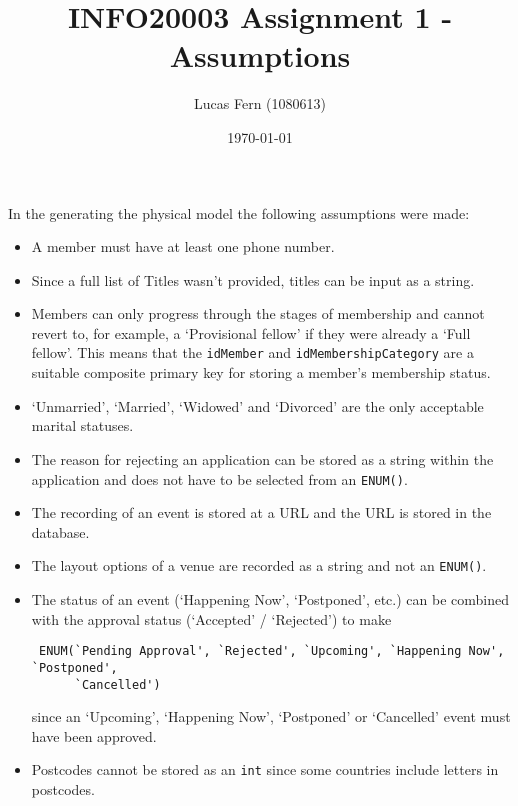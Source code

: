\documentclass{article}
\title{\vspace{-2cm}INFO20003 Assignment 1 - Assumptions}
\date{\today}
\author{Lucas Fern (1080613)}
\begin{document}
\maketitle
In the generating the physical model the following assumptions were made:
\begin{itemize}
    \item A member must have at least one phone number.
    \item Since a full list of Titles wasn't provided, titles can be input as a string.
    \item Members can only progress through the stages of membership and cannot revert to, for example, a `Provisional fellow' if they were already a `Full fellow'. This means that the \verb|idMember| and \verb|idMembershipCategory| are a suitable composite primary key for storing a member's membership status.
    \item `Unmarried', `Married', `Widowed' and `Divorced' are the only acceptable marital statuses.
    \item The reason for rejecting an application can be stored as a string within the application and does not have to be selected from an \verb|ENUM()|.
    \item The recording of an event is stored at a URL and the URL is stored in the database.
    \item The layout options of a venue are recorded as a string and not an \verb|ENUM()|.
    \item The status of an event (`Happening Now', `Postponed', etc.) can be combined with the approval status (`Accepted' / `Rejected') to make \begin{verbatim} ENUM(`Pending Approval', `Rejected', `Upcoming', `Happening Now', `Postponed', 
      `Cancelled') \end{verbatim}
    since an `Upcoming', `Happening Now', `Postponed' or `Cancelled' event must have been approved.
    \item Postcodes cannot be stored as an \verb|int| since some countries include letters in postcodes.
\end{itemize}


\end{document}
